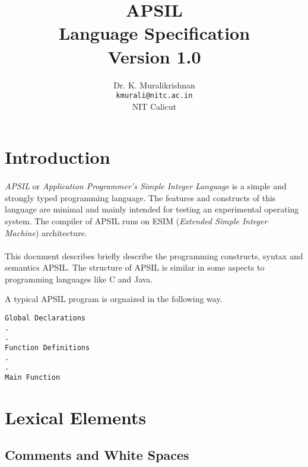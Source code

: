 \documentclass[11pt]{article}
\title{APSIL \\ Language Specification \\
Version 1.0}
\author{Dr. K. Muralikrishnan  \\ \texttt{kmurali@nitc.ac.in} \\ {NIT Calicut} }
\begin{document}
 \newcommand{\kw}[1]{\texttt{#1}}

\maketitle

\pagebreak
\thispagestyle{plain}

\tableofcontents
\pagebreak


\section{Introduction}
\paragraph{}
\textit{APSIL} or \textit{Application Programmer's Simple Integer Language} is a simple and strongly typed programming language. The features and constructs of this language are minimal and mainly intended for testing an experimental operating system. The compiler of APSIL runs on ESIM (\textit{Extended Simple Integer Machine}) architecture.
\paragraph{}
This document describes briefly describe the programming constructs, syntax and semantics APSIL. The structure of APSIL is similar in some aspects to programming languages like C and Java. 

A typical APSIL program is orgnaized in the following way. 

\begin{verbatim}
Global Declarations
. 
. 
Function Definitions
.
. 
Main Function
\end{verbatim}


\section{Lexical Elements}




\subsection{Comments and White Spaces}
\end{document}
